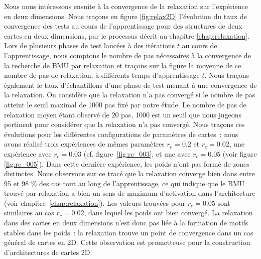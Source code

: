 \documentclass[../main]{subfiles}
\begin{document}
Nous nous intéressons ensuite à la convergence de la relaxation sur l'expérience en deux dimensions. 
Nous traçons en figure \ref{fig:relax2D} l'évolution du taux de convergence des tests au cours de l'apprentissage pour des structures de deux cartes en deux dimensions, par le processus décrit au chapitre \ref{chap:relaxation}. Lors de plusieurs phases de test lancées à des itérations $t$ au cours de l'apprentissage, nous comptons le nombre de pas nécessaires à la convergence de la recherche de BMU par relaxation et traçons sur la figure la moyenne de ce nombre de pas de relaxation, à différents temps d'apprentissage $t$.
Nous traçons également le taux d'échantillons d'une phase de test menant à une convergence de la relaxation. On considère que la relaxation n'a pas convergé si le nombre de pas atteint le seuil maximal de 1000 pas fixé par notre étude. Le nombre de pas de relaxation moyen étant observé de 20 pas, 1000 est un seuil que nous jugeons pertinent pour considérer que la relaxation n'a pas convergé.
Nous traçons ces évolutions pour les différentes configurations de paramètres de cartes~: nous avons réalisé trois expériences de mêmes paramètres $r_e=0.2$ et $r_c = 0.02$, une expérience avec $r_c = 0.03$ (cf. figure~\ref{fig:rc_003}, et une avec $r_c = 0.05$ (voir figure \ref{fig:rc_005}).
Dans cette dernière expérience, les poids n'ont pas formé de zones distinctes.
Nous observons sur ce tracé que la relaxation converge bien dans entre 95 et 98 \% des cas tout au long de l'apprentissage, ce qui indique que le BMU trouvé par relaxation a bien un sens de maximum d'activation dans l'architecture (voir chapitre~\ref{chap:relaxation}).
Les valeurs trouvées pour $r_c = 0.05$ sont similaires au cas $r_c = 0.02$, dans lequel les poids ont bien convergé. La relaxation dans des cartes en deux dimensions n'est donc pas liée à la formation de motifs stables dans les poids~: la relaxation trouve un point de convergence dans un cas général de cartes en 2D.
Cette observation est prometteuse pour la construction d'architectures de cartes 2D.
\end{document}
